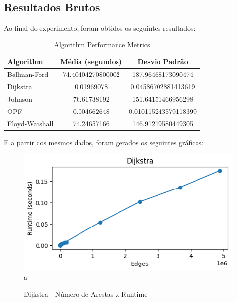\documentclass[12pt]{article}
\begin{document}
\subsection{Resultados Brutos}
Ao final do experimento, foram obtidos os seguintes resultados:
\begin{table}[h]
  \centering
  \begin{tabular}{lcc}
    \toprule
    \textbf{Algorithm} & \textbf{Média (segundos)} & \textbf{Desvio Padrão} \\
    \midrule
    Bellman-Ford & 74.40404270800002 & 187.96468173090474 \\
    Dijkstra & 0.01969078 & 0.04586702881413619 \\
    Johnson & 76.61738192 & 151.64151466956298 \\
    OPF & 0.004662648 & 0.010115243579118399 \\
    Floyd-Warshall & 74.24657166 & 146.91219580449305 \\
    \bottomrule
  \end{tabular}
  \caption{Algorithm Performance Metrics}
\end{table}

E a partir dos mesmos dados, foram gerados os seguintes gráficos:

\begin{figure}[H]
    \centering
        \includegraphics[scale=1]{dijk.png}{a}
        \caption{Dijkstra - Número de Arestas x Runtime}
\end{figure}
\end{document}
